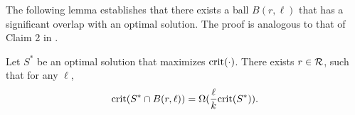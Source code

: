 
The following lemma establishes that there exists a ball $B(r, \ell)$ that has a significant overlap with an optimal solution. The proof is analogous to that of Claim 2 in \cite{kuo2015maximizing}.

\begin{lemma}
\label{lemma:opt}
Let $S^*$ be an optimal solution that maximizes $\text{crit}(\cdot)$. There exists $r\in \mathcal{R}$, such that for any $\ell$,
$$
\text{crit}(S^*\cap B(r, \ell))=\Omega(\frac{\ell}{k}\text{crit}(S^*)).
$$
\end{lemma}


